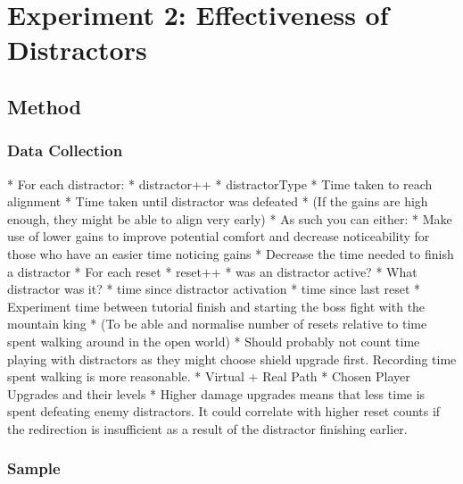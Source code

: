 \chapter{Experiment 2: Effectiveness of Distractors}

\section{Method}

\subsection{Data Collection}
   * For each distractor:
      * distractor++
      * distractorType
      * Time taken to reach alignment
      * Time taken until distractor was defeated
      * (If the gains are high enough, they might be able to align very early)
         * As such you can either: 
            * Make use of lower gains to improve potential comfort and decrease noticeability for those who have an easier time noticing gains
            * Decrease the time needed to finish a distractor
   * For each reset
      * reset++
      * was an distractor active?
         * What distractor was it?
         * time since distractor activation
      * time since last reset
   * Experiment time between tutorial finish and starting the boss fight with the mountain king
      * (To be able and normalise number of resets relative to time spent walking around in the open world)
      * Should probably not count time playing with distractors as they might choose shield upgrade first. Recording time spent walking is more reasonable.
   * Virtual + Real Path
   * Chosen Player Upgrades and their levels
      * Higher damage upgrades means that less time is spent defeating enemy distractors. It could correlate with higher reset counts if the redirection is insufficient as a result of the distractor finishing earlier.
   
\subsection{Sample}